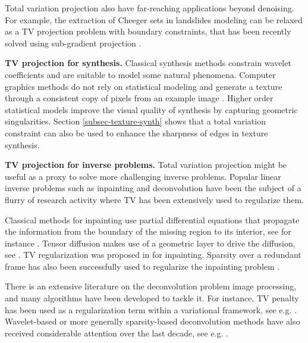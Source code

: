 \documentclass[11pt,nofonttune,a4paper]{IEEEtran}
\newcommand{\myparagraph}[1]{\vspace{2mm}\noindent\textbf{#1}}
\begin{document}
Total variation projection also have far-reaching applications beyond denoising. For example, the extraction of Cheeger sets in landslides modeling \cite{buttazzo-cheeger} can be relaxed as a TV projection problem with boundary constraints, that has been recently solved using sub-gradient projection \cite{carlier-cheeger-numeric}. 

\myparagraph{TV projection for synthesis.} Classical synthesis methods constrain wavelet coefficients \cite{perlin-noise,heeger-pyramid-texture} and are suitable to model some natural phenomena. Computer graphics methods do not rely on statistical modeling and generate a texture through a consistent copy of pixels from an example image \cite{efros-nonparam-sampling,wei-texture-synthesis}. Higher order statistical models \cite{zhu-frame,portilla-parametric-model} improve the visual quality of synthesis by capturing geometric singularities. Section \ref{subsec-texture-synth} shows that a total variation constraint can also be used to enhance the sharpness of edges in texture synthesis. 

\myparagraph{TV projection for inverse problems.}  Total variation projection might be useful as a proxy to solve more challenging inverse problems. Popular linear inverse problems such as inpainting and deconvolution have been the subject of a flurry of research activity where TV has been extensively used to regularize them.

Classical methods for inpainting use partial differential equations that propagate the information from the boundary of the missing region to its interior, see for instance \cite{masnou-level-lines,ballester-filling,bertalmio-inpainting}. Tensor diffusion makes use of a geometric layer to drive the diffusion, see \cite{tschumperle-inpainting}. TV regularization was proposed in \cite{ChanShen01} for inpainting. Sparsity over a redundant frame has also been successfully used to regularize the inpainting problem \cite{starck-inpainting,fadili-inpainting-cj}. 

There is an extensive literature on the deconvolution problem image processing, and many algorithms have been developed to tackle it. For instance, TV penalty has been used as a regularization term within a variational framework, see e.g. \cite{vogel-iterative-tv-inv,wang-tv-split,bect-chambolle-iterative,ChanTVinverse05,RodriguezTVIRLS09}. Wavelet-based or more generally sparsity-based deconvolution methods have also received considerable attention over the last decade, see e.g. \cite{figueiredo-nowak-em,daubechies-iterated,Combettes2007b,Fadili2006a}.
\end{document}
